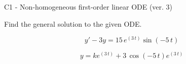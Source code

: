 \begin{exercise}
  \begin{exerciseTitle}C1 - Non-homogeneous first-order linear ODE (ver. 3)\end{exerciseTitle}
  \begin{exerciseStatement}
    
Find the general solution to the given ODE.

    
\[y'-3y= 15 \, e^{\left(3 \, t\right)} \sin\left(-5 \, t\right)\]

  \end{exerciseStatement}
  \begin{exerciseAnswer}
    
\[y= k e^{\left(3 \, t\right)} + 3 \, \cos\left(-5 \, t\right) e^{\left(3 \, t\right)}\]

  \end{exerciseAnswer}
\end{exercise}
